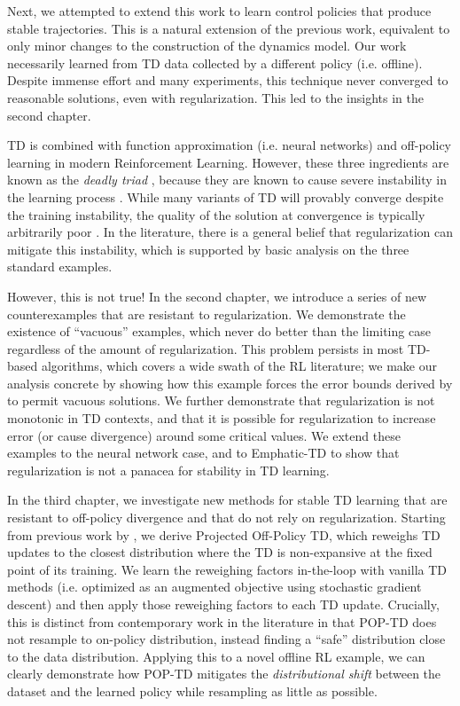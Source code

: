 \documentclass[11pt]{book}
\begin{document}
Next, we attempted to extend this work to learn control policies that produce stable trajectories. This is a natural extension of the previous work, equivalent to only minor changes to the construction of the dynamics model. Our work necessarily learned from TD data collected by a different policy (i.e. offline). Despite immense effort and many experiments, this technique never converged to reasonable solutions, even with regularization. This led to the insights in the second chapter.

TD is combined with function approximation (i.e. neural networks) and off-policy learning in modern Reinforcement Learning. However, these three ingredients are known as the \emph{deadly triad} \cite[p.~264]{sutton2020reinforcement}, because they are known to cause severe instability in the learning process \citet{tsitsiklis1996analysis}. While many variants of TD will provably converge despite the training instability, the quality of the solution at convergence is typically arbitrarily poor \citep{kolter2011fixed}. In the literature, there is a general belief that regularization can mitigate this instability, which is supported by basic analysis on the three standard examples.

However, this is not true! In the second chapter, we introduce a series of new counterexamples that are resistant to regularization. We demonstrate the existence of ``vacuous'' examples, which never do better than the limiting case regardless of the amount of regularization. This problem persists in most TD-based algorithms, which covers a wide swath of the RL literature; we make our analysis concrete by showing how this example forces the error bounds derived by \citet{zhang2021breaking} to permit vacuous solutions. We further demonstrate that regularization is not monotonic in TD contexts, and that it is possible for regularization to increase error (or cause divergence) around some critical values. We extend these examples to the neural network case, and to Emphatic-TD to show that regularization is not a panacea for stability in TD learning.

In the third chapter, we investigate new methods for stable TD learning that are resistant to off-policy divergence and that do not rely on regularization. Starting from previous work by \citet{kolter2011fixed}, we derive Projected Off-Policy TD, which reweighs TD updates to the closest distribution where the TD is non-expansive at the fixed point of its training. We learn the reweighing factors in-the-loop with vanilla TD methods (i.e. optimized as an augmented objective using stochastic gradient descent) and then apply those reweighing factors to each TD update. Crucially, this is distinct from contemporary work in the literature in that POP-TD does not resample to on-policy distribution, instead finding a ``safe'' distribution close to the data distribution. Applying this to a novel offline RL example, we can clearly demonstrate how POP-TD mitigates the \emph{distributional shift} between the dataset and the learned policy \cite{levine2020survey} while resampling as little as possible.
\end{document}
